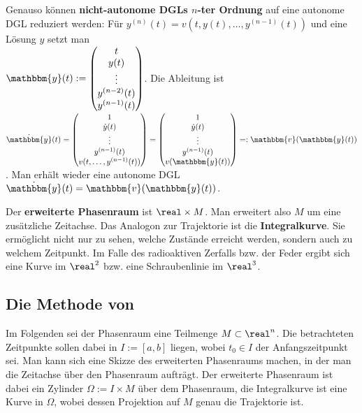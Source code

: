 Genauso können \textbf{nicht-autonome DGLs $n$-ter Ordnung}
auf eine autonome DGL reduziert werden:
Für $y^{(n)}(t) = v(t, y(t), \dotsc, y^{(n-1)}(t))$ und eine Lösung $y$ setzt
man \\
$\mathbbm{y}(t) :=
\begin{pmatrix}t \\ y(t) \\ \vdots \\ y^{(n-2)}(t) \\
y^{(n-1)}(t)\end{pmatrix}$.
Die Ableitung ist $\dot{\mathbbm{y}}(t) =
\begin{pmatrix}1 \\ \dot{y}(t) \\ \vdots \\ y^{(n-1)}(t) \\
v(t, \dotsc, y^{(n-1)}(t))\end{pmatrix} =
\begin{pmatrix}1 \\ \dot{y}(t) \\ \vdots \\ y^{(n-1)}(t) \\
v(\mathbbm{y}(t))\end{pmatrix} =: \mathbbm{v}(\mathbbm{y}(t))$.
Man erhält wieder eine autonome DGL
$\dot{\mathbbm{y}}(t) = \mathbbm{v}(\mathbbm{y}(t))$.

\linie

Der \textbf{erweiterte Phasenraum} ist $\real \times M$.
Man erweitert also $M$ um eine zusätzliche Zeitachse.
Das Analogon zur Trajektorie ist die \textbf{Integralkurve}.
Sie ermöglicht nicht nur zu sehen, welche Zustände erreicht werden,
sondern auch zu welchem Zeitpunkt.
Im Falle des radioaktiven Zerfalls bzw. der Feder ergibt sich eine
Kurve im $\real^2$ bzw. eine Schraubenlinie im $\real^3$.

\subsection{%
    Die Methode von %
}

Im Folgenden sei der Phasenraum eine Teilmenge $M \subset \real^n$.
Die betrachteten Zeitpunkte sollen dabei in $I := [a,b]$ liegen, wobei
$t_0 \in I$ der Anfangszeitpunkt sei.
Man kann sich eine Skizze des erweiterten Phasenraums machen,
in der man die Zeitachse über den Phasenraum aufträgt.
Der erweiterte Phasenraum ist dabei ein Zylinder $\Omega := I \times M$
über dem Phasenraum, die Integralkurve ist eine Kurve in $\Omega$, wobei
dessen Projektion auf $M$ genau die Trajektorie ist.

